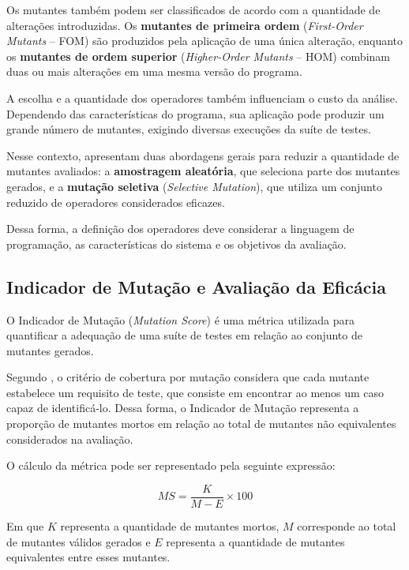 Os mutantes também podem ser classificados de acordo com a quantidade de alterações introduzidas. Os \textbf{mutantes de primeira ordem} (\textit{First-Order Mutants} -- FOM) são produzidos pela aplicação de uma única alteração, enquanto os \textbf{mutantes de ordem superior} (\textit{Higher-Order Mutants} -- HOM) combinam duas ou mais alterações em uma mesma versão do programa.

A escolha e a quantidade dos operadores também influenciam o custo da análise. Dependendo das características do programa, sua aplicação pode produzir um grande número de mutantes, exigindo diversas execuções da suíte de testes.

Nesse contexto,  apresentam duas abordagens gerais para reduzir a quantidade de mutantes avaliados: a \textbf{amostragem aleatória}, que seleciona parte dos mutantes gerados, e a \textbf{mutação seletiva} (\textit{Selective Mutation}), que utiliza um conjunto reduzido de operadores considerados eficazes.

Dessa forma, a definição dos operadores deve considerar a linguagem de programação, as características do sistema e os objetivos da avaliação.

\subsection{Indicador de Mutação e Avaliação da Eficácia}
\label{subsec:mutation-score}

O Indicador de Mutação (\textit{Mutation Score}) é uma métrica utilizada para quantificar a adequação de uma suíte de testes em relação ao conjunto de mutantes gerados.

Segundo , o critério de cobertura por mutação considera que cada mutante estabelece um requisito de teste, que consiste em encontrar ao menos um caso capaz de identificá-lo. Dessa forma, o Indicador de Mutação representa a proporção de mutantes mortos em relação ao total de mutantes não equivalentes considerados na avaliação.

O cálculo da métrica pode ser representado pela seguinte expressão:

\begin{equation}
    MS = \frac{K}{M - E} \times 100
    \label{eq:mutation-score}
\end{equation}

Em que $K$ representa a quantidade de mutantes mortos, $M$ corresponde ao total de mutantes válidos gerados e $E$ representa a quantidade de mutantes equivalentes entre esses mutantes.

